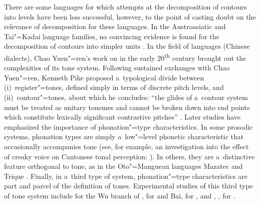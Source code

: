 There are some languages for which attempts at the decomposition of contours into levels have been
less successful, however, to the point of casting doubt on the relevance of decomposition for these
languages. In the Austroasiatic and Tai"=Kadai language families, no convincing evidence is found for
the decomposition of contours into simpler units \citep[e.g.][639]{morey2014}. 
In the field of  languages (Chinese dialects), Chao Yuen"=ren’s work on  in the
early 20\textsuperscript{th} century \citep{chao1929,chao1933} brought out the complexities
of its tone system. Following sustained exchanges with Chao Yuen"=ren, Kenneth Pike proposed
a~typological divide between (i)~register"=tones, defined simply in terms of
discrete pitch levels, and (ii)~{contour}"=tones, about which he concludes: “the glides of a~{contour}
system must be treated as unitary tonemes and cannot be broken down into end points which constitute
lexically significant contrastive pitches” \citep[10]{pike1948}. Later studies have emphasized the
importance of phonation"=type characteristics. In some prosodic systems,
phonation types are simply a~low"=level phonetic characteristic that occasionally accompanies tone (see, for example, an investigation into the effect of
creaky voice on Cantonese tonal perception: \citealt{yuetal2014}). In others, they
are a~distinctive feature orthogonal to tone, as in the Oto"=Manguean languages Mazatec
\citep{garelleketal2011} and Trique \citep{dicanio2012}. Finally, in a~third type of system,
phonation"=type characteristics are part and parcel of the definition of tones. Experimental studies
of this third type of tone system include \citet{rose1982,rose1989a,rose1990} for the Wu branch of
, \citet{edmondsonetal2001} for  and Bai, \citet{mazaudonetal2008} for , and
\citet{andruskietal2000}, \citet{andruskietal2004}, \citet{kuang2013} for . 

